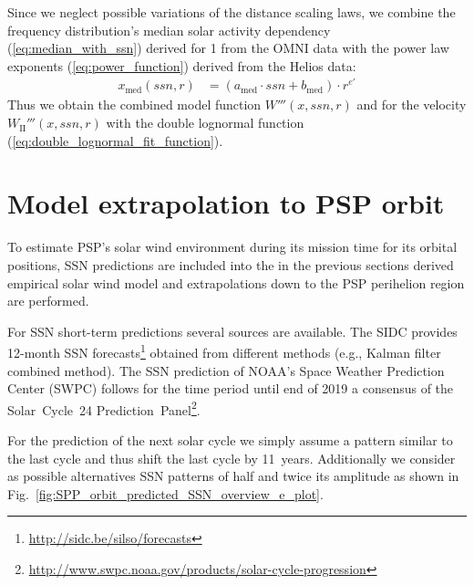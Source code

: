 Since we neglect possible variations of the distance scaling laws, we combine the frequency distribution’s median solar activity dependency (\ref{eq:median_with_ssn}) derived for \SI{1}{\au} from the OMNI data with the power law exponents (\ref{eq:power_function}) derived from the Helios data:
\begin{align}
	x_\text{med}(ssn,r) &= (a_\text{med} \cdot ssn + b_\text{med}) \cdot r^{e'}
\end{align}
Thus we obtain the combined model function $W'''(x,ssn,r)$ and for the velocity $W_\text{II}'''(x,ssn,r)$ with the double lognormal function (\ref{eq:double_lognormal_fit_function}).


\section{Model extrapolation to PSP orbit}
\label{sec:model_extrapolation_to_psp_orbit}
To estimate PSP’s solar wind environment during its mission time for its orbital positions, SSN predictions are included into the in the previous sections derived empirical solar wind model and extrapolations down to the PSP perihelion region are performed.

For SSN short-term predictions several sources are available. The SIDC provides 12-month SSN forecasts\footnote{\url{http://sidc.be/silso/forecasts}} obtained from different methods (e.g., Kalman filter combined method). The SSN prediction of NOAA's Space Weather Prediction Center (SWPC) follows for the time period until end of 2019 a consensus of the Solar~Cycle~24 Prediction~Panel\footnote{\url{http://www.swpc.noaa.gov/products/solar-cycle-progression}}.

For the prediction of the next solar cycle we simply assume a pattern similar to the last cycle and thus shift the last cycle by 11~years. Additionally we consider as possible alternatives SSN patterns of half and twice its amplitude as shown in Fig.~\ref{fig:SPP_orbit_predicted_SSN_overview_e_plot}.


